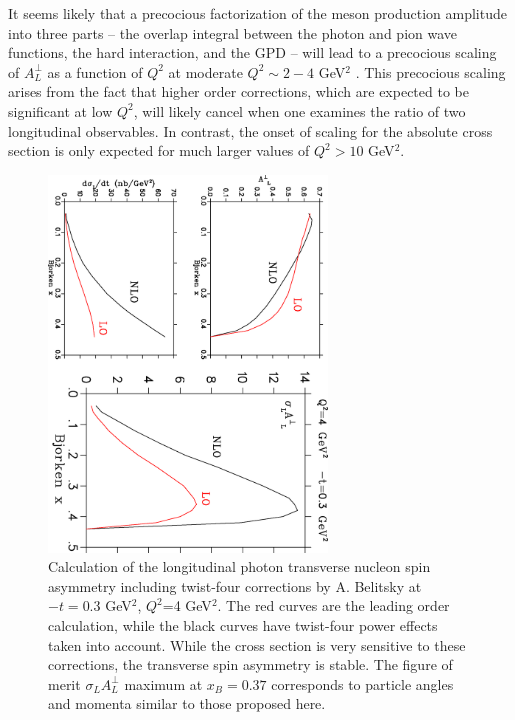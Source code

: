 \documentclass[preprint,superscriptaddress]{revtex4}
\begin{document}
It seems likely that a precocious factorization of the meson production
amplitude into three parts -- the overlap integral between the photon and pion
wave functions, the hard interaction, and the GPD -- will lead to a precocious
scaling of $A_L^{\perp}$ as a function of $Q^2$ at moderate $Q^2\sim 2-4$
GeV$^2$ \cite{Fr99}.  This precocious scaling arises from the fact that higher
order corrections, which are expected to be significant at low $Q^2$, will
likely cancel when one examines the ratio of two longitudinal observables.  In
contrast, the onset of scaling for the absolute cross section is only expected
for much larger values of $Q^2>10$ GeV$^2$.

\begin{figure}[hbt!]
\begin{center}
\includegraphics[height=10cm,angle=90.]{belitsky.ps}
\caption{\label{fig:belitsky_atpi}
Calculation of the longitudinal photon transverse nucleon spin asymmetry
including twist-four corrections by A. Belitsky \cite{belitsky} at $-t=0.3$
GeV$^2$, $Q^2$=4 GeV$^2$.  The red curves are the leading order calculation,
while the black curves have twist-four power effects taken into account.  While
the cross section is very sensitive to these corrections, the transverse spin
asymmetry is stable.  The figure of merit $\sigma_L A_L^{\perp}$ maximum at
$x_B=0.37$ corresponds to particle angles and momenta similar to those proposed
here.}
\end{center}
\end{figure}
\end{document}
